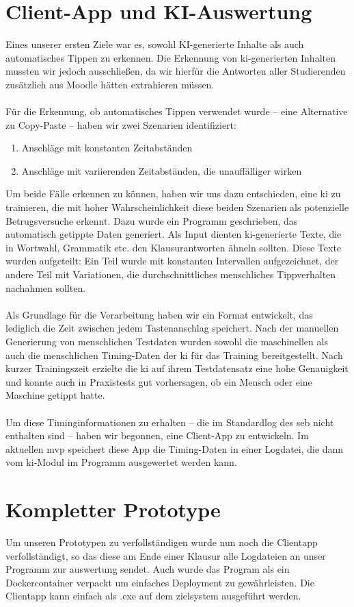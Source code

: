 \section{Client-App und KI-Auswertung} 
Eines unserer ersten Ziele war es, sowohl KI-generierte Inhalte als auch automatisches Tippen zu erkennen. 
Die Erkennung von \gls{ki}-generierten Inhalten mussten wir jedoch ausschließen, da wir hierfür die Antworten aller Studierenden zusätzlich aus Moodle hätten extrahieren müssen.\\
\\
Für die Erkennung, ob automatisches Tippen verwendet wurde – eine Alternative zu Copy-Paste – haben wir zwei Szenarien identifiziert:
\begin{enumerate} 
\item Anschläge mit konstanten Zeitabständen 
\item Anschläge mit variierenden Zeitabständen, die unauffälliger wirken 
\end{enumerate}
Um beide Fälle erkennen zu können, haben wir uns dazu entschieden, eine \gls{ki} zu trainieren, die mit hoher Wahrscheinlichkeit diese beiden Szenarien als potenzielle Betrugsversuche erkennt. 
Dazu wurde ein Programm geschrieben, das automatisch getippte Daten generiert. 
Als Input dienten \gls{ki}-generierte Texte, die in Wortwahl, Grammatik etc. den Klausurantworten ähneln sollten. 
Diese Texte wurden aufgeteilt: Ein Teil wurde mit konstanten Intervallen aufgezeichnet, der andere Teil mit Variationen, die durchschnittliches menschliches Tippverhalten nachahmen sollten.\\
\\
Als Grundlage für die Verarbeitung haben wir ein Format entwickelt, das lediglich die Zeit zwischen jedem Tastenanschlag speichert. 
Nach der manuellen Generierung von menschlichen Testdaten wurden sowohl die maschinellen als auch die menschlichen Timing-Daten der \gls{ki} für das Training bereitgestellt. 
Nach kurzer Trainingszeit erzielte die \gls{ki} auf ihrem Testdatensatz eine hohe Genauigkeit und konnte auch in Praxistests gut vorhersagen, ob ein Mensch oder eine Maschine getippt hatte.\\
\\
Um diese Timinginformationen zu erhalten – die im Standardlog des \gls{seb} nicht enthalten sind – haben wir begonnen, eine Client-App zu entwickeln. 
Im aktuellen \gls{mvp} speichert diese App die Timing-Daten in einer Logdatei, die dann vom \gls{ki}-Modul im Programm ausgewertet werden kann.

\section{Kompletter Prototype}
Um unseren Prototypen zu verfollständigen wurde nun noch die Clientapp verfollständigt, so das diese am Ende einer Klausur alle Logdateien an unser Programm zur auswertung sendet.
Auch wurde das Program als ein Dockercontainer verpackt um einfaches Deployment zu gewährleisten.
Die Clientapp kann einfach als .exe auf dem zielsystem ausgeführt werden.
